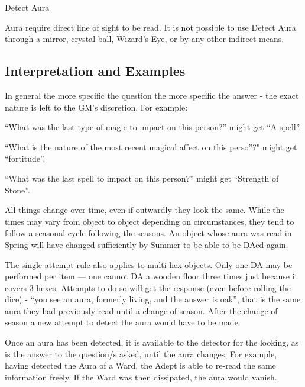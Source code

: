 \begin{multicols*}{3}
\begin{talent}{Detect Aura}
\begin{effects}
Aura require direct line of sight to be read.  It is not possible to
use Detect Aura through a mirror, crystal ball, Wizard's Eye, or by
any other indirect means.
\end{effects}
\end{talent}

\subsection{Interpretation and Examples}

\begin{Enumerate}
\item
In general the more specific the question the more 
specific the answer - the exact nature is left to the GM's 
discretion. For example:
\begin{Itemize}
\item ``What was the last type of magic to impact on this person?''
might get ``A spell''.

\item ``What is the nature of the most recent magical affect on 
this perso''?" might get ``fortitude''.

\item ``What was the last spell to impact on this person?'' might 
get ``Strength of Stone''. 
\end{Itemize}

\item
All things change over time, even if outwardly they look the
same. While the times may vary from object to object depending on
circumstances, they tend to follow a seasonal cycle following the
seasons. An object whose aura was read in Spring will have changed
sufficiently by Summer to be able to be DAed again.

\item
The single attempt rule also applies to multi-hex objects. Only one DA
may be performed per item --- one cannot DA a wooden floor three times
just because it covers 3 hexes. Attempts to do so will get the
response (even before rolling the dice) - ``you see an aura, formerly
living, and the answer is oak'', that is the same aura they had
previously read until a change of season. After the change of season a
new attempt to detect the aura would have to be made.

\item
Once an aura has been detected, it is available to the detector for
the looking, as is the answer to the question/s asked, until the aura
changes. For example, having detected the Aura of a Ward, the Adept is
able to re-read the same information freely. If the Ward was then
dissipated, the aura would vanish.


\end{Enumerate}
\end{multicols*}
